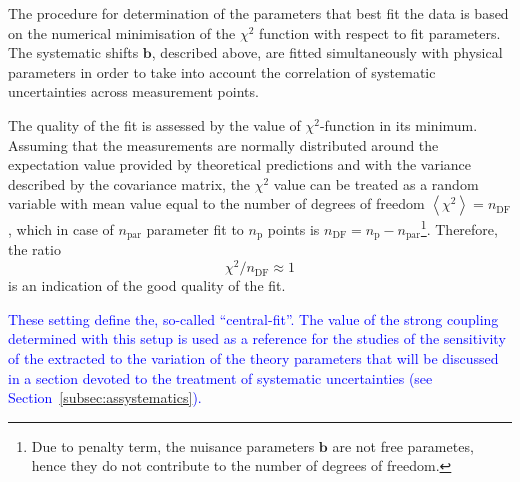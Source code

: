 The procedure for determination of the parameters that best fit the data is based on the numerical minimisation of the $\chi^2$ function with respect to fit parameters. The systematic shifts $\mathbf{b}$, described above, are fitted simultaneously with physical parameters in order to take into account the correlation of systematic uncertainties across measurement points.

The quality of the fit is assessed by the value of $\chi^2$-function in its minimum. Assuming that the measurements are normally distributed around the expectation value provided by theoretical predictions and with the variance described by the covariance matrix, the $\chi^2$ value can be treated as a random variable with mean value equal to the number of degrees of freedom $\left\langle \chi^2 \right\rangle = n_\text{DF}$, which in case of $n_\text{par}$ parameter fit to $n_\text{p}$ points is $n_\text{DF}=n_\text{p}-n_\text{par}$\footnote{Due to penalty term, the nuisance parameters $\mathbf{b}$ are not free parametes, hence they do not contribute to the number of degrees of freedom.}. Therefore, the ratio
\begin{equation}
 \chi^2/n_\text{DF} \approx 1
\end{equation}
is an indication of the good quality of the fit.

\textcolor{blue}{These setting define the, so-called ``central-fit''. The value of the strong coupling determined with this setup is used as a reference for the studies of the sensitivity of the extracted \asz to the variation of the theory parameters that will be discussed in a section devoted to the treatment of systematic uncertainties (see Section~\ref{subsec:assystematics}).}
